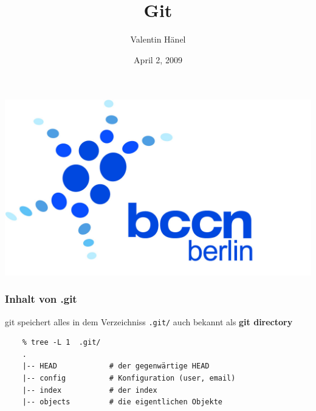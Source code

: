 \documentclass{beamer}
\author{Valentin H\"anel}
\institute{Bernstein Center for Computational Neuroscience Berlin}
\title{Git}
\date{April 2, 2009}
\begin{document}

\begin{frame}
	\includegraphics[scale=0.05]{BCCN_logo_berlin.jpg}
	\titlepage
\end{frame}




\begin{frame}[fragile]
\frametitle{Inhalt von .git}

git speichert alles in dem Verzeichniss {\tt.git/} auch bekannt als \textbf{git
directory}

\begin{verbatim}
    % tree -L 1  .git/
    .
    |-- HEAD            # der gegenwärtige HEAD
    |-- config          # Konfiguration (user, email)
    |-- index           # der index
    |-- objects         # die eigentlichen Objekte

\end{verbatim}

\end{frame}
\end{document}
